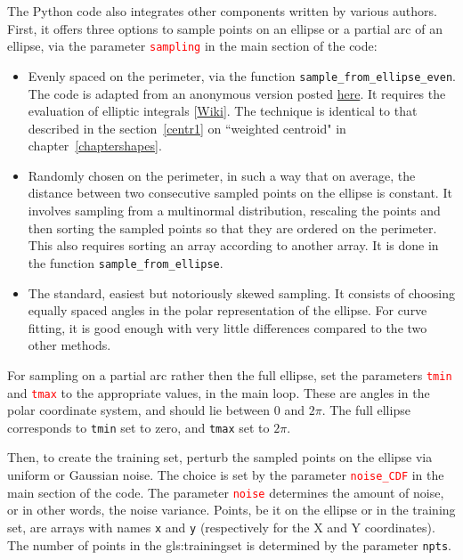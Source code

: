 \documentclass[oneside,10pt]{book}
\begin{document}
\noindent The Python code also integrates other components written by various authors. First, it offers three options to sample points on an ellipse or a partial arc of an ellipse, via the parameter \textcolor{red}{\texttt{sampling}} in the main section of the code:
\begin{itemize}
\item Evenly spaced on the perimeter, via the function \texttt{sample\_from\_ellipse\_even}. The code is adapted from an anonymous version posted
\href{https://math.stackexchange.com/questions/3710402/generate-random-points-on-perimeter-of-ellipse}{here}. It requires the evaluation of
 \textcolor{index}{elliptic integrals} [\href{https://en.wikipedia.org/wiki/Elliptic_integral}{Wiki}]. The technique is identical to that described in the section~\ref{centr1}  on ``weighted centroid" in chapter~\ref{chaptershapes}.
\item Randomly chosen on the perimeter, in such a way that on average, the distance between two consecutive sampled points on the ellipse is constant.
 It involves sampling from a multinormal distribution, rescaling the points and then sorting the sampled points so that they are ordered on the perimeter. This
 also requires sorting an array according to another array.  It is done in the function
 \texttt{sample\_from\_ellipse}.
\item The standard, easiest but notoriously skewed sampling. It consists of choosing equally spaced angles in the polar representation of the ellipse. For curve fitting, it is good enough with very little differences compared to the two other methods.
\end{itemize}

\noindent For sampling on a partial arc rather then the full ellipse, set the parameters
\textcolor{red}{\texttt{tmin}} and \textcolor{red}{\texttt{tmax}} to the appropriate values, in the main loop.
These are angles in the polar coordinate system, and should lie between $0$ and $2\pi$. The full ellipse corresponds to
 \texttt{tmin} set to zero, and \texttt{tmax} set to $2\pi$. \vspace{1ex}

\vspace{1ex}

\noindent Then, to create the training set, perturb the sampled points on the ellipse via uniform or Gaussian noise.
 The choice is set by the parameter \textcolor{red}{\texttt{noise\_CDF}} in the main section of the code. The parameter
\textcolor{red}{\texttt{noise}} determines the amount of noise, or in other words, the noise variance. Points, be it on the ellipse or in the training set,
 are arrays with names \texttt{x} and \texttt{y} (respectively for the X and Y coordinates). The number of points in the \gls{gls:trainingset} is determined
 by the parameter \textcolor{index}{\texttt{npts}}.
\end{document}
